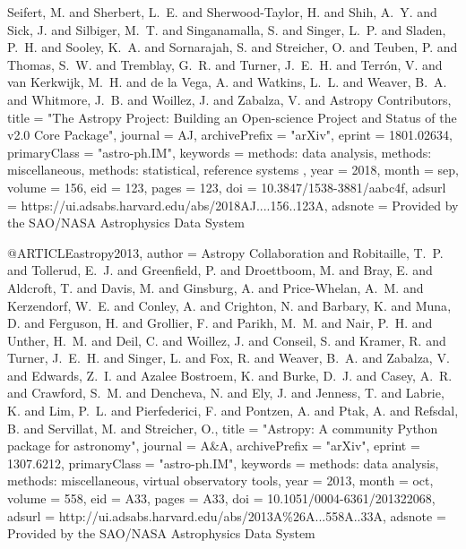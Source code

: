 {{	{Seifert}, M. and {Sherbert}, L.~E. and {Sherwood-Taylor}, H. and
	{Shih}, A.~Y. and {Sick}, J. and {Silbiger}, M.~T. and {Singanamalla}, S. and
	{Singer}, L.~P. and {Sladen}, P.~H. and {Sooley}, K.~A. and
	{Sornarajah}, S. and {Streicher}, O. and {Teuben}, P. and {Thomas}, S.~W. and
	{Tremblay}, G.~R. and {Turner}, J.~E.~H. and {Terr{\'o}n}, V. and
	{van Kerkwijk}, M.~H. and {de la Vega}, A. and {Watkins}, L.~L. and
	{Weaver}, B.~A. and {Whitmore}, J.~B. and {Woillez}, J. and
	{Zabalza}, V. and {Astropy Contributors}},
    title = "{The Astropy Project: Building an Open-science Project and Status of the v2.0 Core Package}",
  journal = {AJ},
archivePrefix = "arXiv",
   eprint = {1801.02634},
 primaryClass = "astro-ph.IM",
 keywords = {methods: data analysis, methods: miscellaneous, methods: statistical, reference systems },
     year = 2018,
    month = sep,
   volume = 156,
      eid = {123},
    pages = {123},
      doi = {10.3847/1538-3881/aabc4f},
   adsurl = {https://ui.adsabs.harvard.edu/abs/2018AJ....156..123A},
  adsnote = {Provided by the SAO/NASA Astrophysics Data System}
}





@ARTICLE{astropy2013,
   author = {{Astropy Collaboration} and {Robitaille}, T.~P. and {Tollerud}, E.~J. and
	{Greenfield}, P. and {Droettboom}, M. and {Bray}, E. and {Aldcroft}, T. and
	{Davis}, M. and {Ginsburg}, A. and {Price-Whelan}, A.~M. and
	{Kerzendorf}, W.~E. and {Conley}, A. and {Crighton}, N. and
	{Barbary}, K. and {Muna}, D. and {Ferguson}, H. and {Grollier}, F. and
	{Parikh}, M.~M. and {Nair}, P.~H. and {Unther}, H.~M. and {Deil}, C. and
	{Woillez}, J. and {Conseil}, S. and {Kramer}, R. and {Turner}, J.~E.~H. and
	{Singer}, L. and {Fox}, R. and {Weaver}, B.~A. and {Zabalza}, V. and
	{Edwards}, Z.~I. and {Azalee Bostroem}, K. and {Burke}, D.~J. and
	{Casey}, A.~R. and {Crawford}, S.~M. and {Dencheva}, N. and
	{Ely}, J. and {Jenness}, T. and {Labrie}, K. and {Lim}, P.~L. and
	{Pierfederici}, F. and {Pontzen}, A. and {Ptak}, A. and {Refsdal}, B. and
	{Servillat}, M. and {Streicher}, O.},
    title = "{Astropy: A community Python package for astronomy}",
  journal = {A\&A},
archivePrefix = "arXiv",
   eprint = {1307.6212},
 primaryClass = "astro-ph.IM",
 keywords = {methods: data analysis, methods: miscellaneous, virtual observatory tools},
     year = 2013,
    month = oct,
   volume = 558,
      eid = {A33},
    pages = {A33},
      doi = {10.1051/0004-6361/201322068},
   adsurl = {http://ui.adsabs.harvard.edu/abs/2013A\%26A...558A..33A},
  adsnote = {Provided by the SAO/NASA Astrophysics Data System}
}
